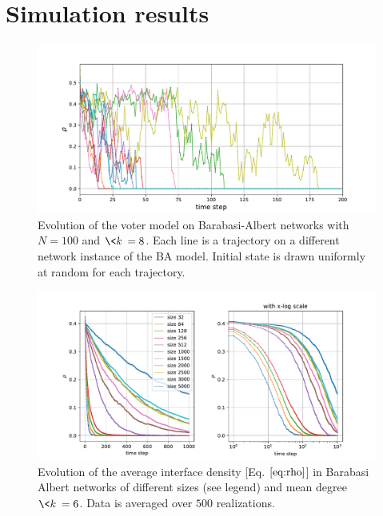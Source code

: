 \section{Simulation results}
\begin{figure}[H]
    \centering
    \includegraphics[width=\linewidth]{latex_source/images/voter/example_evolution.pdf}
    \caption{Evolution of the voter model on Barabasi-Albert networks with $N=100$ and $\<k\> = 8$. Each line is a trajectory on a different network instance of the BA model. Initial state is drawn uniformly at random for each trajectory.}
    \label{fig:enter-label}
\end{figure}

\begin{figure}[H]
    \centering
    \includegraphics[width=\linewidth]{latex_source/images/voter/BA_node_update_rule_results_logscale.pdf}
    \caption{Evolution of the average interface density [Eq. $\ref{eq:rho}$] in Barabasi Albert networks of different sizes (see legend) and mean degree $\<k\>= 6$. Data is averaged over $500$ realizations. }
    \label{fig:BA_evolution}
\end{figure}

